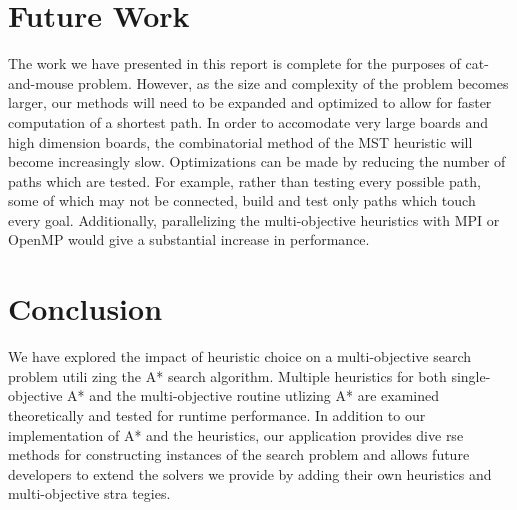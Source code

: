 \documentclass[12pt, conference, compsocconf]{IEEEtran}
\begin{document}
\section{Future Work}
The work we have presented in this report is complete for the purposes of
cat-and-mouse problem.  However, as the size and complexity of the problem
becomes larger, our methods will need to be expanded and optimized to allow for
faster computation of a shortest path.  In order to accomodate very large
boards and high dimension boards, the combinatorial method of the MST heuristic
will become increasingly slow.  Optimizations can be made by reducing the
number of paths which are tested.  For example, rather than testing every
possible path, some of which may not be connected, build and test only paths
which touch every goal.  Additionally, parallelizing the multi-objective
heuristics with MPI or OpenMP would give a substantial increase in performance.

\section{Conclusion}
We have explored the impact of heuristic choice on a multi-objective search
problem utili zing the A* search algorithm.  Multiple heuristics for both
single-objective A* and the multi-objective routine utlizing A* are examined
theoretically and tested for runtime performance.  In addition to our
implementation of A* and the heuristics, our application provides dive rse
methods for constructing instances of the search problem and allows future
developers to extend the solvers we provide by adding their own heuristics and
multi-objective stra tegies.


%
%
\end{document}
